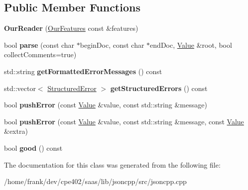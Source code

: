 \subsection*{Public Member Functions}
\begin{DoxyCompactItemize}
\item 
\hypertarget{class_json_1_1_our_reader_a48a850914b9c8d7781be172930c478e5}{}{\bfseries Our\+Reader} (\hyperlink{class_json_1_1_our_features}{Our\+Features} const \&features)\label{class_json_1_1_our_reader_a48a850914b9c8d7781be172930c478e5}

\item 
\hypertarget{class_json_1_1_our_reader_aba4f8749aab7f02ec17f107e392caf80}{}bool {\bfseries parse} (const char $\ast$begin\+Doc, const char $\ast$end\+Doc, \hyperlink{class_json_1_1_value}{Value} \&root, bool collect\+Comments=true)\label{class_json_1_1_our_reader_aba4f8749aab7f02ec17f107e392caf80}

\item 
\hypertarget{class_json_1_1_our_reader_ae9cbb7dbd9c6c96be37432e8dfa1afcb}{}std\+::string {\bfseries get\+Formatted\+Error\+Messages} () const \label{class_json_1_1_our_reader_ae9cbb7dbd9c6c96be37432e8dfa1afcb}

\item 
\hypertarget{class_json_1_1_our_reader_a02ef7871af3706754a233c36e6d489e9}{}std\+::vector$<$ \hyperlink{struct_json_1_1_our_reader_1_1_structured_error}{Structured\+Error} $>$ {\bfseries get\+Structured\+Errors} () const \label{class_json_1_1_our_reader_a02ef7871af3706754a233c36e6d489e9}

\item 
\hypertarget{class_json_1_1_our_reader_aef7aa4ca22ffaa38c401b16951d20e1e}{}bool {\bfseries push\+Error} (const \hyperlink{class_json_1_1_value}{Value} \&value, const std\+::string \&message)\label{class_json_1_1_our_reader_aef7aa4ca22ffaa38c401b16951d20e1e}

\item 
\hypertarget{class_json_1_1_our_reader_ad43315cbb0d6804e3b7177e84a1ec53d}{}bool {\bfseries push\+Error} (const \hyperlink{class_json_1_1_value}{Value} \&value, const std\+::string \&message, const \hyperlink{class_json_1_1_value}{Value} \&extra)\label{class_json_1_1_our_reader_ad43315cbb0d6804e3b7177e84a1ec53d}

\item 
\hypertarget{class_json_1_1_our_reader_a048346238d703ad9aed06beb686e6102}{}bool {\bfseries good} () const \label{class_json_1_1_our_reader_a048346238d703ad9aed06beb686e6102}

\end{DoxyCompactItemize}


The documentation for this class was generated from the following file\+:\begin{DoxyCompactItemize}
\item 
/home/frank/dev/cpe402/saas/lib/jsoncpp/src/jsoncpp.\+cpp\end{DoxyCompactItemize}
